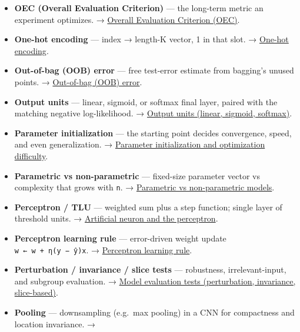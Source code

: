 \documentclass[
  10pt,
  letterpaper,
  onecolumn]{article}
\begin{document}
\begin{itemize}
  \textbf{Objective / cost / loss / error function} --- the quantity the
  optimizer minimizes; the terms are interchangeable. →
  \protect\hyperlink{objective-cost-loss-and-error-functions}{Objective,
  cost, loss, and error functions}.
\item
  \textbf{OEC (Overall Evaluation Criterion)} --- the long-term metric
  an experiment optimizes. →
  \protect\hyperlink{overall-evaluation-criterion-oec}{Overall
  Evaluation Criterion (OEC)}.
\item
  \textbf{One-hot encoding} --- index → length-K vector, 1 in that slot.
  → \protect\hyperlink{one-hot-encoding}{One-hot encoding}.
\item
  \textbf{Out-of-bag (OOB) error} --- free test-error estimate from
  bagging's unused points. →
  \protect\hyperlink{out-of-bag-oob-error}{Out-of-bag (OOB) error}.
\item
  \textbf{Output units} --- linear, sigmoid, or softmax final layer,
  paired with the matching negative log-likelihood. →
  \protect\hyperlink{output-units-linear-sigmoid-softmax}{Output units
  (linear, sigmoid, softmax)}.
\item
  \textbf{Parameter initialization} --- the starting point decides
  convergence, speed, and even generalization. →
  \protect\hyperlink{parameter-initialization-and-optimization-difficulty}{Parameter
  initialization and optimization difficulty}.
\item
  \textbf{Parametric vs non-parametric} --- fixed-size parameter vector
  vs complexity that grows with \texttt{n}. →
  \protect\hyperlink{parametric-vs-non-parametric-models}{Parametric vs
  non-parametric models}.
\item
  \textbf{Perceptron / TLU} --- weighted sum plus a step function;
  single layer of threshold units. →
  \protect\hyperlink{artificial-neuron-and-the-perceptron}{Artificial
  neuron and the perceptron}.
\item
  \textbf{Perceptron learning rule} --- error-driven weight update
  \texttt{w\ ←\ w\ +\ η(y\ −\ ŷ)x}. →
  \protect\hyperlink{perceptron-learning-rule}{Perceptron learning
  rule}.
\item
  \textbf{Perturbation / invariance / slice tests} --- robustness,
  irrelevant-input, and subgroup evaluation. →
  \protect\hyperlink{model-evaluation-tests-perturbation-invariance-slice-based}{Model
  evaluation tests (perturbation, invariance, slice-based)}.
\item
  \textbf{Pooling} --- downsampling (e.g.~max pooling) in a CNN for
  compactness and location invariance. →

\end{itemize}
\end{document}
